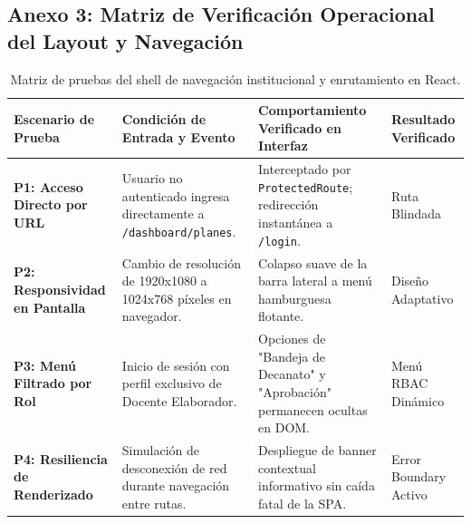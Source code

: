 \documentclass[12pt,a4paper]{article}
\begin{document}
\subsection*{Anexo 3: Matriz de Verificación Operacional del Layout y Navegación}
\begin{table}[H]
\centering
\small
\renewcommand{\arraystretch}{1.15}
\begin{tabularx}{\textwidth}{|>{\hsize=0.75\hsize\raggedright\arraybackslash\bfseries\footnotesize}X|>{\hsize=1.25\hsize\raggedright\arraybackslash\footnotesize}X|>{\hsize=1.35\hsize\raggedright\arraybackslash\footnotesize}X|>{\hsize=0.65\hsize\centering\arraybackslash\footnotesize}X|}
\hline
\rowcolor{tableheader}
\textbf{Escenario de Prueba} & \textbf{Condición de Entrada y Evento} & \textbf{Comportamiento Verificado en Interfaz} & \textbf{Resultado Verificado} \\
\hline
P1: Acceso Directo por URL & Usuario no autenticado ingresa directamente a \texttt{/\allowbreak  dashboard/\allowbreak  planes}. & Interceptado por \texttt{ProtectedRoute}; redirección instantánea a \texttt{/\allowbreak  login}. & Ruta Blindada \\
\hline
P2: Responsividad en Pantalla & Cambio de resolución de 1920x1080 a 1024x768 píxeles en navegador. & Colapso suave de la barra lateral a menú hamburguesa flotante. & Diseño Adaptativo \\
\hline
P3: Menú Filtrado por Rol & Inicio de sesión con perfil exclusivo de Docente Elaborador. & Opciones de "Bandeja de Decanato" y "Aprobación" permanecen ocultas en DOM. & Menú RBAC Dinámico \\
\hline
P4: Resiliencia de Renderizado & Simulación de desconexión de red durante navegación entre rutas. & Despliegue de banner contextual informativo sin caída fatal de la SPA. & Error Boundary Activo \\
\hline
\end{tabularx}
\caption{Matriz de pruebas del shell de navegación institucional y enrutamiento en React.}
\end{table}
\end{document}

